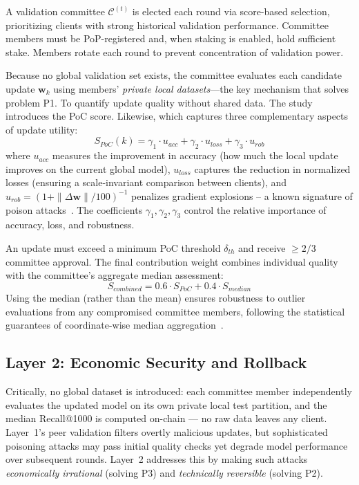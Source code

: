\documentclass[conference]{IEEEtran}
\begin{document}
A validation committee $\mathcal{C}^{(t)}$ is elected each round via score-based selection, prioritizing clients with strong historical validation performance. Committee members must be PoP-registered and, when staking is enabled, hold sufficient stake. Members rotate each round to prevent concentration of validation power.

Because no global validation set exists, the committee evaluates each candidate update $\mathbf{w}_k$ using members' \emph{private local datasets}---the key mechanism that solves problem P1. To quantify update quality without shared data. The study introduces the PoC score. Likewise, which captures three complementary aspects of update utility:
\begin{equation}
S_{PoC}(k) = \gamma_1 \cdot u_{acc} + \gamma_2 \cdot u_{loss} + \gamma_3 \cdot u_{rob}
\label{eq:poc}
\end{equation}
where $u_{acc}$ measures the improvement in accuracy (how much the local update improves on the current global model), $u_{loss}$ captures the reduction in normalized losses (ensuring a scale-invariant comparison between clients), and $u_{rob} = (1 + \|\Delta\mathbf{w}\| / 100)^{-1}$ penalizes gradient explosions -- a known signature of poison attacks~\cite{fang2020local}. The coefficients $\gamma_1, \gamma_2, \gamma_3$ control the relative importance of accuracy, loss, and robustness.

An update must exceed a minimum PoC threshold $\delta_{th}$ and receive $\geq 2/3$ committee approval. The final contribution weight combines individual quality with the committee's aggregate median assessment:
\begin{equation}
S_{combined} = 0.6 \cdot S_{PoC} + 0.4 \cdot S_{median}
\label{eq:combined}
\end{equation}
Using the median (rather than the mean) ensures robustness to outlier evaluations from any compromised committee members, following the statistical guarantees of coordinate-wise median aggregation~\cite{yin2018byzantine}.

\subsection{Layer 2: Economic Security and Rollback}

Critically, no global dataset is introduced: each committee member independently evaluates the updated model on its own private local test partition, and the median Recall@1000 is computed on-chain — no raw data leaves any client. Layer~1's peer validation filters overtly malicious updates, but sophisticated poisoning attacks may pass initial quality checks yet degrade model performance over subsequent rounds. Layer~2 addresses this by making such attacks \emph{economically irrational} (solving P3) and \emph{technically reversible} (solving P2).
\end{document}
